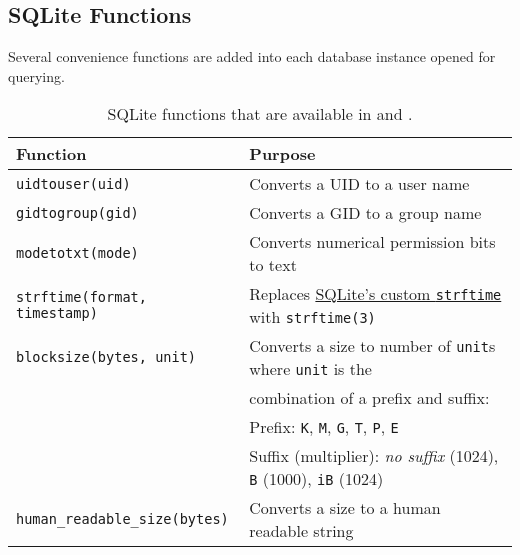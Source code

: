 \clearpage
\subsection{SQLite Functions}
Several convenience functions are added into each database instance
opened for querying.

\begin{table}[htb]
  \centering
  \caption{SQLite functions that are available in \gufiquery and \querydbs.}
  \begin{tabular}{| l | l |}
    \hline
    Function & Purpose \\
    \hline
    \texttt{uidtouser(uid)} & Converts a UID to a user name \\
    \hline
    \texttt{gidtogroup(gid)} & Converts a GID to a group name \\
    \hline
    \texttt{modetotxt(mode)} & Converts numerical permission bits to text \\
    \hline
    \texttt{strftime(format, timestamp)} & Replaces \href{https://www.sqlite.org/lang_datefunc.html}{SQLite's custom \texttt{strftime}} with \texttt{strftime(3)} \\
    \hline
    \texttt{blocksize(bytes, unit)} & Converts a size to number of \texttt{unit}s where \texttt{unit} is the \\
                                    & combination of a prefix and suffix: \\
                                    & Prefix: \texttt{K}, \texttt{M}, \texttt{G}, \texttt{T}, \texttt{P}, \texttt{E}\\
                                    & Suffix (multiplier): \textit{no suffix} (1024), \texttt{B} (1000), \texttt{iB} (1024) \\
    \hline
    \texttt{human\_readable\_size(bytes)} & Converts a size to a human readable string \\
    \hline
  \end{tabular}
\end{table}

